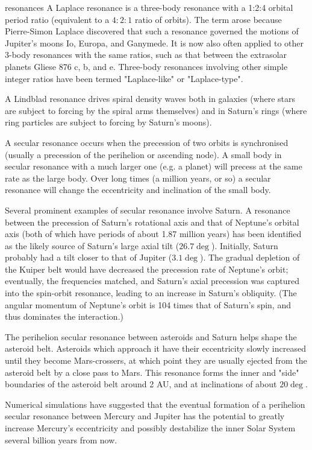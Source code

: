 \begin{itemize}
\begin{frame}[allowframebreaks]{resonances}
A Laplace resonance is a three-body resonance with a 1:2:4 orbital period ratio (equivalent to a $4:2:1$ ratio of orbits). The term arose because Pierre-Simon Laplace discovered that such a resonance governed the motions of Jupiter's moons Io, Europa, and Ganymede. It is now also often applied to other 3-body resonances with the same ratios, such as that between the extrasolar planets Gliese 876 c, b, and e. Three-body resonances involving other simple integer ratios have been termed "Laplace-like" or "Laplace-type".

A Lindblad resonance drives spiral density waves both in galaxies (where stars are subject to forcing by the spiral arms themselves) and in Saturn's rings (where ring particles are subject to forcing by Saturn's moons).

A secular resonance occurs when the precession of two orbits is synchronised (usually a precession of the perihelion or ascending node). A small body in secular resonance with a much larger one (e.g. a planet) will precess at the same rate as the large body. Over long times (a million years, or so) a secular resonance will change the eccentricity and inclination of the small body.

Several prominent examples of secular resonance involve Saturn. A resonance between the precession of Saturn's rotational axis and that of Neptune's orbital axis (both of which have periods of about 1.87 million years) has been identified as the likely source of Saturn's large axial tilt ($26.7\deg$). Initially, Saturn probably had a tilt closer to that of Jupiter ($3.1\deg$). The gradual depletion of the Kuiper belt would have decreased the precession rate of Neptune's orbit; eventually, the frequencies matched, and Saturn's axial precession was captured into the spin-orbit resonance, leading to an increase in Saturn's obliquity. (The angular momentum of Neptune's orbit is 104 times that of Saturn's spin, and thus dominates the interaction.)

The perihelion secular resonance between asteroids and Saturn  helps shape the asteroid belt. Asteroids which approach it have their eccentricity slowly increased until they become Mars-crossers, at which point they are usually ejected from the asteroid belt by a close pass to Mars. This resonance forms the inner and "side" boundaries of the asteroid belt around 2 AU, and at inclinations of about $20\deg$.

Numerical simulations have suggested that the eventual formation of a perihelion secular resonance between Mercury and Jupiter has the potential to greatly increase Mercury's eccentricity and possibly destabilize the inner Solar System several billion years from now.


\end{frame}
\end{itemize}
